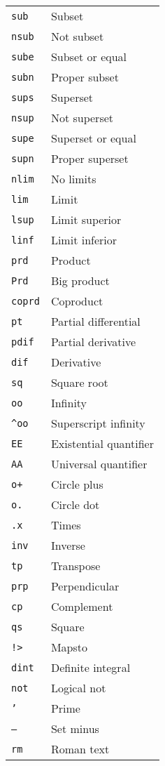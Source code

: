 \documentclass{article}
\newcommand{\snippet}[1]{\textcolor{titlebg}{\texttt{#1}}}
\begin{document}
\begin{center}
\begin{tabularx}{\textwidth}{lY}
\snippet{sub} & Subset \\
\snippet{nsub} & Not subset \\
\snippet{sube} & Subset or equal \\
\snippet{subn} & Proper subset \\
\snippet{sups} & Superset \\
\snippet{nsup} & Not superset \\
\snippet{supe} & Superset or equal \\
\snippet{supn} & Proper superset \\
\snippet{nlim} & No limits \\
\snippet{lim} & Limit \\
\snippet{lsup} & Limit superior \\
\snippet{linf} & Limit inferior \\
\snippet{prd} & Product \\
\snippet{Prd} & Big product \\
\snippet{coprd} & Coproduct \\
\snippet{pt} & Partial differential \\
\snippet{pdif} & Partial derivative \\
\snippet{dif} & Derivative \\
\snippet{sq} & Square root \\
\snippet{oo} & Infinity \\
\snippet{\texttt{\textasciicircum}oo} & Superscript infinity \\
\snippet{EE} & Existential quantifier \\
\snippet{AA} & Universal quantifier \\
\snippet{o+} & Circle plus \\
\snippet{o.} & Circle dot \\
\snippet{.x} & Times \\
\snippet{inv} & Inverse \\
\snippet{tp} & Transpose \\
\snippet{prp} & Perpendicular \\
\snippet{cp} & Complement \\
\snippet{qs} & Square \\
\snippet{!>} & Mapsto \\
\snippet{dint} & Definite integral \\
\snippet{not} & Logical not \\
\snippet{'} & Prime \\
\snippet{--} & Set minus \\
\snippet{rm} & Roman text \\

\end{tabularx}
\end{center}
\end{document}
